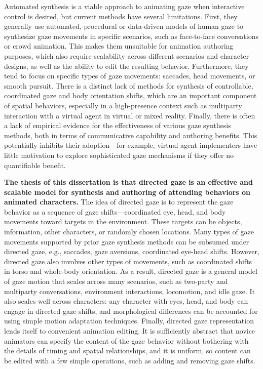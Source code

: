 Automated synthesis is a viable approach to animating gaze when interactive control is desired, but current methods have several limitations. First, they generally use automated, procedural or data-driven models of human gaze to synthesize gaze movements in specific scenarios, such as face-to-face conversations or crowd animation. This makes them unsuitable for animation authoring purposes, which also require scalability across different scenarios and character designs, as well as the ability to edit the resulting behavior. Furthermore, they tend to focus on specific types of gaze movements: saccades, head movements, or smooth pursuit. There is a distinct lack of methods for synthesis of controllable, coordinated gaze and body orientation shifts, which are an important component of spatial behaviors, especially in a high-presence context such as multiparty interaction with a virtual agent in virtual or mixed reality. Finally, there is often a lack of empirical evidence for the effectiveness of various gaze synthesis methods, both in terms of communicative capability and authoring benefits. This potentially inhibits their adoption---for example, virtual agent implementers have little motivation to explore sophisticated gaze mechanisms if they offer no quantifiable benefit.

\textbf{The thesis of this dissertation is that directed gaze is an effective and scalable model for synthesis and authoring of attending behaviors on animated characters.} The idea of directed gaze is to represent the gaze behavior as a sequence of gaze shifts---coordinated eye, head, and body movements toward targets in the environment. These targets can be objects, information, other characters, or randomly chosen locations. Many types of gaze movements supported by prior gaze synthesis methods can be subsumed under directed gaze, e.g., saccades, gaze aversions, coordinated eye-head shifts. However, directed gaze also involves other types of movements, such as coordinated shifts in torso and whole-body orientation. As a result, directed gaze is a general model of gaze motion that scales across many scenarios, such as two-party and multiparty conversations, environment interactions, locomotion, and idle gaze. It also scales well across characters: any character with eyes, head, and body can engage in directed gaze shifts, and morphological differences can be accounted for using simple motion adaptation techniques. Finally, directed gaze representation lends itself to convenient animation editing. It is sufficiently abstract that novice animators can specify the content of the gaze behavior without bothering with the details of timing and spatial relationships, and it is uniform, so content can be edited with a few simple operations, such as adding and removing gaze shifts.

